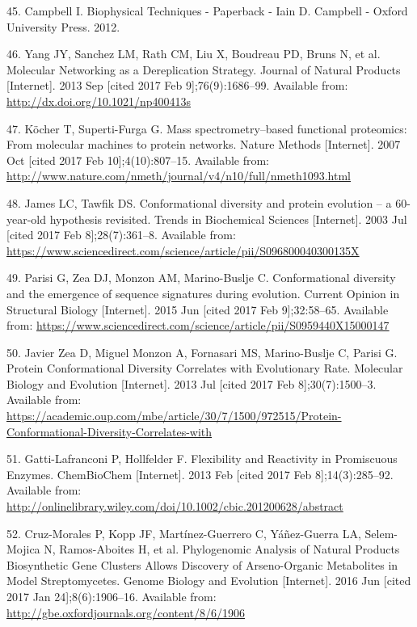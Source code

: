 \documentclass[12pt,twoside]{reedthesis}
\begin{document}
  \hypertarget{ref-campbell_biophysical_2012}{}
  45. Campbell I. Biophysical Techniques - Paperback - Iain D. Campbell -
  Oxford University Press. 2012.
  
  \hypertarget{ref-yang_molecular_2013}{}
  46. Yang JY, Sanchez LM, Rath CM, Liu X, Boudreau PD, Bruns N, et al.
  Molecular Networking as a Dereplication Strategy. Journal of Natural
  Products {[}Internet{]}. 2013 Sep {[}cited 2017 Feb 9{]};76(9):1686--99.
  Available from: \url{http://dx.doi.org/10.1021/np400413s}
  
  \hypertarget{ref-kocher_mass_2007}{}
  47. Köcher T, Superti-Furga G. Mass spectrometry--based functional
  proteomics: From molecular machines to protein networks. Nature Methods
  {[}Internet{]}. 2007 Oct {[}cited 2017 Feb 10{]};4(10):807--15.
  Available from:
  \url{http://www.nature.com/nmeth/journal/v4/n10/full/nmeth1093.html}
  
  \hypertarget{ref-james_conformational_2003}{}
  48. James LC, Tawfik DS. Conformational diversity and protein evolution
  -- a 60-year-old hypothesis revisited. Trends in Biochemical Sciences
  {[}Internet{]}. 2003 Jul {[}cited 2017 Feb 8{]};28(7):361--8. Available
  from:
  \url{https://www.sciencedirect.com/science/article/pii/S096800040300135X}
  
  \hypertarget{ref-parisi_conformational_2015}{}
  49. Parisi G, Zea DJ, Monzon AM, Marino-Buslje C. Conformational
  diversity and the emergence of sequence signatures during evolution.
  Current Opinion in Structural Biology {[}Internet{]}. 2015 Jun {[}cited
  2017 Feb 9{]};32:58--65. Available from:
  \url{https://www.sciencedirect.com/science/article/pii/S0959440X15000147}
  
  \hypertarget{ref-javier_zea_protein_2013}{}
  50. Javier Zea D, Miguel Monzon A, Fornasari MS, Marino-Buslje C, Parisi
  G. Protein Conformational Diversity Correlates with Evolutionary Rate.
  Molecular Biology and Evolution {[}Internet{]}. 2013 Jul {[}cited 2017
  Feb 8{]};30(7):1500--3. Available from:
  \url{https://academic.oup.com/mbe/article/30/7/1500/972515/Protein-Conformational-Diversity-Correlates-with}
  
  \hypertarget{ref-gatti-lafranconi_flexibility_2013}{}
  51. Gatti-Lafranconi P, Hollfelder F. Flexibility and Reactivity in
  Promiscuous Enzymes. ChemBioChem {[}Internet{]}. 2013 Feb {[}cited 2017
  Feb 8{]};14(3):285--92. Available from:
  \url{http://onlinelibrary.wiley.com/doi/10.1002/cbic.201200628/abstract}
  
  \hypertarget{ref-cruz-morales_phylogenomic_2016}{}
  52. Cruz-Morales P, Kopp JF, Martínez-Guerrero C, Yáñez-Guerra LA,
  Selem-Mojica N, Ramos-Aboites H, et al. Phylogenomic Analysis of Natural
  Products Biosynthetic Gene Clusters Allows Discovery of Arseno-Organic
  Metabolites in Model Streptomycetes. Genome Biology and Evolution
  {[}Internet{]}. 2016 Jun {[}cited 2017 Jan 24{]};8(6):1906--16.
  Available from: \url{http://gbe.oxfordjournals.org/content/8/6/1906}
  
\end{document}
